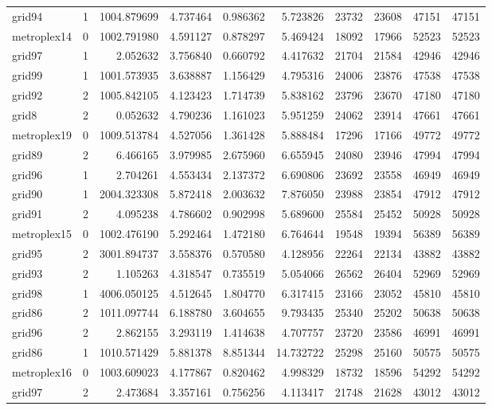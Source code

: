 \begin{longtable}{|l|r|r|r|r|r|r|r|r|r|}
grid94 & 1 & 1004.879699 & 4.737464 & 0.986362 & 5.723826 & 23732 & 23608 & 47151 & 47151 \\
metroplex14 & 0 & 1002.791980 & 4.591127 & 0.878297 & 5.469424 & 18092 & 17966 & 52523 & 52523 \\
grid97 & 1 & 2.052632 & 3.756840 & 0.660792 & 4.417632 & 21704 & 21584 & 42946 & 42946 \\
grid99 & 1 & 1001.573935 & 3.638887 & 1.156429 & 4.795316 & 24006 & 23876 & 47538 & 47538 \\
grid92 & 2 & 1005.842105 & 4.123423 & 1.714739 & 5.838162 & 23796 & 23670 & 47180 & 47180 \\
grid8 & 2 & 0.052632 & 4.790236 & 1.161023 & 5.951259 & 24062 & 23914 & 47661 & 47661 \\
metroplex19 & 0 & 1009.513784 & 4.527056 & 1.361428 & 5.888484 & 17296 & 17166 & 49772 & 49772 \\
grid89 & 2 & 6.466165 & 3.979985 & 2.675960 & 6.655945 & 24080 & 23946 & 47994 & 47994 \\
grid96 & 1 & 2.704261 & 4.553434 & 2.137372 & 6.690806 & 23692 & 23558 & 46949 & 46949 \\
grid90 & 1 & 2004.323308 & 5.872418 & 2.003632 & 7.876050 & 23988 & 23854 & 47912 & 47912 \\
grid91 & 2 & 4.095238 & 4.786602 & 0.902998 & 5.689600 & 25584 & 25452 & 50928 & 50928 \\
metroplex15 & 0 & 1002.476190 & 5.292464 & 1.472180 & 6.764644 & 19548 & 19394 & 56389 & 56389 \\
grid95 & 2 & 3001.894737 & 3.558376 & 0.570580 & 4.128956 & 22264 & 22134 & 43882 & 43882 \\
grid93 & 2 & 1.105263 & 4.318547 & 0.735519 & 5.054066 & 26562 & 26404 & 52969 & 52969 \\
grid98 & 1 & 4006.050125 & 4.512645 & 1.804770 & 6.317415 & 23166 & 23052 & 45810 & 45810 \\
grid86 & 2 & 1011.097744 & 6.188780 & 3.604655 & 9.793435 & 25340 & 25202 & 50638 & 50638 \\
grid96 & 2 & 2.862155 & 3.293119 & 1.414638 & 4.707757 & 23720 & 23586 & 46991 & 46991 \\
grid86 & 1 & 1010.571429 & 5.881378 & 8.851344 & 14.732722 & 25298 & 25160 & 50575 & 50575 \\
metroplex16 & 0 & 1003.609023 & 4.177867 & 0.820462 & 4.998329 & 18732 & 18596 & 54292 & 54292 \\
grid97 & 2 & 2.473684 & 3.357161 & 0.756256 & 4.113417 & 21748 & 21628 & 43012 & 43012 \\

\end{longtable}
